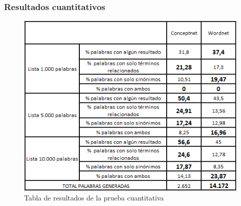 \subsubsection{Resultados cuantitativos}
\label{cap:subsec:pruebaCuantitativa}
\begin{figure}[!h]
	\includegraphics[width=.8\textwidth]{Imagenes/Bitmap/Capitulo4/tabla_cuantitativa}
	\centering
	\caption{Tabla de resultados de la prueba cuantitativa}
	\label{fig:tabla_cuantitativa}
\end{figure}

